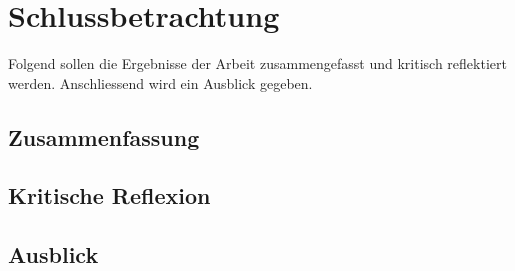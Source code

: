 \chapter{Schlussbetrachtung}\label{chapter:Schlussbetrachtun}
Folgend sollen die Ergebnisse der Arbeit zusammengefasst und kritisch reflektiert werden. Anschliessend wird ein Ausblick gegeben.
\section{Zusammenfassung}\label{section:Zusammenfassun}

\section{Kritische Reflexion}\label{section:Kritische-Reflexio}


\section{Ausblick}\label{section:Ausblic}

